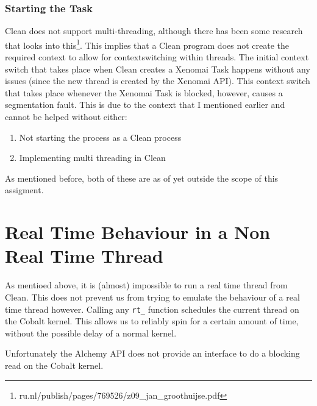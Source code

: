 \documentclass{scrartcl}
\begin{document}
\subsubsection{Starting the Task}
Clean does not support multi-threading, although there has been some research that looks into this\footnote{ru.nl/publish/pages/769526/z09\_jan\_groothuijse.pdf}.
This implies that a Clean program does not create the required context to allow for contextswitching within threads.
The initial context switch that takes place when Clean creates a Xenomai Task happens without any issues (since the new thread is created by the Xenomai API).
This context switch that takes place whenever the Xenomai Task is blocked, however, causes a segmentation fault.
This is due to the context that I mentioned earlier and cannot be helped without either:
\begin{enumerate}
	\item Not starting the process as a Clean process
	\item Implementing multi threading in Clean
\end{enumerate}
As mentioned before, both of these are as of yet outside the scope of this assigment.

\section{Real Time Behaviour in a Non Real Time Thread}
As mentioed above, it is (almost) impossible to run a real time thread from Clean.
This does not prevent us from trying to emulate the behaviour of a real time thread however.
Calling any \texttt{rt\_} function schedules the current thread on the Cobalt kernel.
This allows us to reliably spin for a certain amount of time, without the possible delay of a normal kernel.

Unfortunately the Alchemy API does not provide an interface to do a blocking read on the Cobalt kernel.
\end{document}
